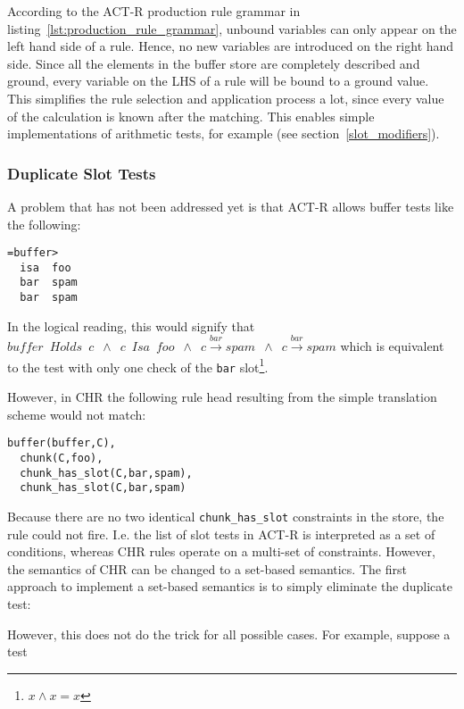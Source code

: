 According to the ACT-R production rule grammar in listing~\ref{lst:production_rule_grammar}, unbound variables can only appear on the left hand side of a rule. Hence, no new variables are introduced on the right hand side. Since all the elements in the buffer store are completely described and ground, every variable on the LHS of a rule will be bound to a ground value. This simplifies the rule selection and application process a lot, since every value of the calculation is known after the matching. This enables simple implementations of arithmetic tests, for example (see section~\ref{slot_modifiers}).

\subsubsection{Duplicate Slot Tests}
\label{implementation:duplicate_slot_tests}

A problem that has not been addressed yet is that ACT-R allows buffer tests like the following:

\begin{lstlisting}
=buffer>
  isa  foo
  bar  spam
  bar  spam
\end{lstlisting}

In the logical reading, this would signify that $buffer \enspace Holds \enspace c \enspace \wedge \enspace c \enspace Isa \enspace foo \enspace \wedge \enspace c \xrightarrow{bar} spam \enspace \wedge \enspace c \xrightarrow{bar} spam$ which is equivalent to the test with only one check of the \lstinline|bar| slot\footnote{$x \wedge x = x$}.

However, in CHR the following rule head resulting from the simple translation scheme would not match:

\begin{lstlisting}
buffer(buffer,C),
  chunk(C,foo),
  chunk_has_slot(C,bar,spam),
  chunk_has_slot(C,bar,spam)
\end{lstlisting}

Because there are no two identical \lstinline|chunk_has_slot| constraints in the store, the rule could not fire. I.e. the list of slot tests in ACT-R is interpreted as a set of conditions, whereas CHR rules operate on a multi-set of constraints. However, the semantics of CHR can be changed to a set-based semantics. The first approach to implement a set-based semantics is to simply eliminate the duplicate test:

However, this does not do the trick for all possible cases. For example, suppose a test

